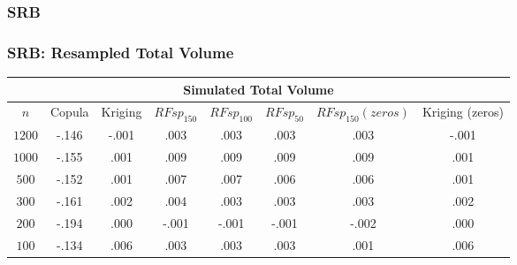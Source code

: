 \documentclass{beamer}
\begin{document}
\subsubsection{SRB}

\begin{frame}
	\frametitle{SRB: Resampled Total Volume}
	\begin{center}
		\begin{tabular}{|| c | c c c c c c c ||}
		\hline
		\multicolumn{8}{||c||}{Simulated Total Volume} \\
		\hline
		$n$ & Copula & Kriging & $RFsp_{150}$ & $RFsp_{100}$ & $RFsp_{50}$ & $RFsp_{150}(zeros)$ & Kriging (zeros) \\ [.5ex] 
		\hline\hline
		$1200$ & \cellcolor{gray}-.146 & \cellcolor{cyan}-.001 & .003 & .003 & .003 & .003 & \cellcolor{cyan}-.001 \\
		$1000$ & \cellcolor{gray}-.155 & \cellcolor{cyan}.001 & .009 & .009 & .009 & .009 & \cellcolor{cyan}.001 \\
		$500$ & \cellcolor{gray}-.152 & \cellcolor{cyan}.001 & .007 & .007 & .006 & .006 & \cellcolor{cyan}.001 \\
		$300$ & \cellcolor{gray}-.161 & \cellcolor{cyan}.002 & .004 & .003 & .003 & .003 & \cellcolor{cyan}.002 \\
		$200$ & \cellcolor{gray}-.194 & \cellcolor{cyan}.000 & -.001 & -.001 & -.001 & -.002 & \cellcolor{cyan}.000 \\
		$100$ & \cellcolor{gray}-.134 & .006 & .003 & .003 & .003 & \cellcolor{cyan}.001 & .006 \\ [.5ex] 
		\hline
		\end{tabular}
	\end{center}
\end{frame}
\end{document}
